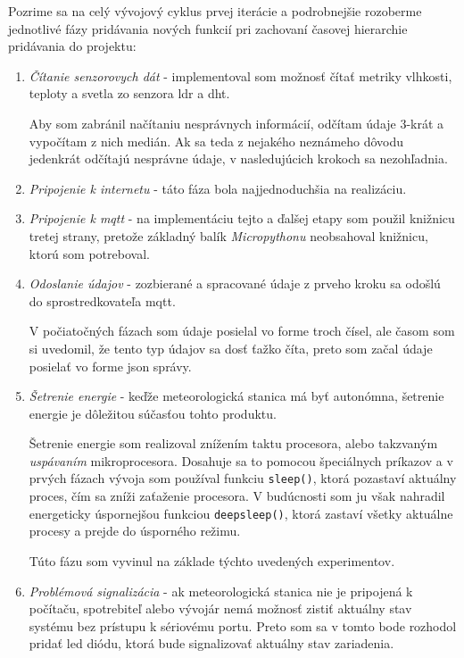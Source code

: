 Pozrime sa na celý vývojový cyklus prvej iterácie a podrobnejšie rozoberme jednotlivé fázy pridávania nových funkcií pri zachovaní časovej hierarchie pridávania do projektu:
\begin{enumerate}
    \item \textit{Čítanie senzorovych dát} - implementoval som možnosť čítať metriky vlhkosti, teploty a svetla zo senzora \gls{ldr} a \gls{dht}. 
    
    Aby som zabránil načítaniu nesprávnych informácií, odčítam údaje 3-krát a vypočítam z nich medián. Ak sa teda z nejakého neznámeho dôvodu jedenkrát odčítajú nesprávne údaje, v nasledujúcich krokoch sa nezohľadnia.
    
    \item \textit{Pripojenie k internetu} - táto fáza bola najjednoduchšia na realizáciu.
    \item \textit{Pripojenie k \gls{mqtt}} - na implementáciu tejto a ďalšej etapy som použil knižnicu tretej strany, pretože základný balík \textit{Micropythonu} neobsahoval knižnicu, ktorú som potreboval. 
    \item \textit{Odoslanie údajov} - zozbierané a spracované údaje z prveho kroku sa odošlú do sprostredkovateľa \gls{mqtt}. 
    
    V počiatočných fázach som údaje posielal vo forme troch čísel, ale časom som si uvedomil, že tento typ údajov sa dosť ťažko číta, preto som začal údaje posielať vo forme \gls{json} správy.
    \item \textit{Šetrenie energie} - keďže meteorologická stanica má byť autonómna, šetrenie energie je dôležitou súčasťou tohto produktu. 
    
    Šetrenie energie som realizoval znížením taktu procesora, alebo takzvaným \textit{uspávaním} mikroprocesora. Dosahuje sa to pomocou špeciálnych príkazov a v prvých fázach vývoja som používal funkciu \verb|sleep()|, ktorá pozastaví aktuálny proces, čím sa zníži zaťaženie procesora. V budúcnosti som ju však nahradil energeticky úspornejšou funkciou \verb|deepsleep()|, ktorá zastaví všetky aktuálne procesy a prejde do úsporného režimu. 
    
    Túto fázu som vyvinul na základe týchto uvedených experimentov\cite{spotrebaEnergie1}\cite{spotrebaEnergie2}\cite{spotrebaEnergie3}.
    \item \textit{Problémová signalizácia} - ak meteorologická stanica nie je pripojená k počítaču, spotrebiteľ alebo vývojár nemá možnosť zistiť aktuálny stav systému bez prístupu k sériovému portu. Preto som sa v tomto bode rozhodol pridať \gls{led} diódu, ktorá bude signalizovať aktuálny stav zariadenia. 
    

\end{enumerate}
